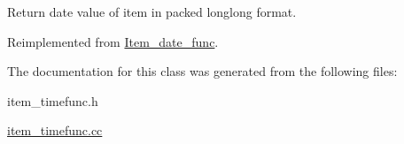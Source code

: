 Return date value of item in packed longlong format. 

Reimplemented from \mbox{\hyperlink{classItem__date__func_a34f95de47fe9ff5bfe16fb641ec22a42}{Item\+\_\+date\+\_\+func}}.



The documentation for this class was generated from the following files\+:\begin{DoxyCompactItemize}
\item 
item\+\_\+timefunc.\+h\item 
\mbox{\hyperlink{item__timefunc_8cc}{item\+\_\+timefunc.\+cc}}\end{DoxyCompactItemize}
